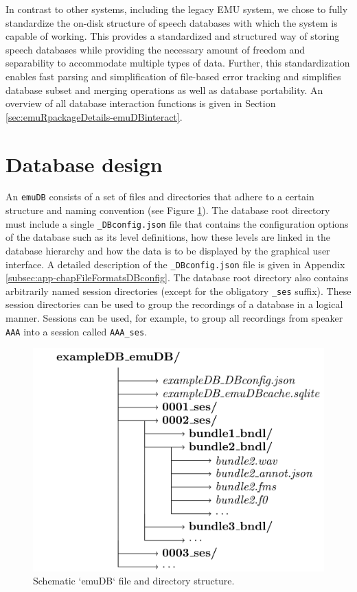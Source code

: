 \documentclass[]{book}
\theoremstyle{definition}
\theoremstyle{definition}
\theoremstyle{definition}
\theoremstyle{remark}
\begin{document}
In contrast to other systems, including the legacy EMU system, we chose
to fully standardize the on-disk structure of speech databases with
which the system is capable of working. This provides a standardized and
structured way of storing speech databases while providing the necessary
amount of freedom and separability to accommodate multiple types of
data. Further, this standardization enables fast parsing and
simplification of file-based error tracking and simplifies database
subset and merging operations as well as database portability. An
overview of all database interaction functions is given in Section
\ref{sec:emuRpackageDetails-emuDBinteract}.

\hypertarget{database-design}{%
\section{Database design}\label{database-design}}

An \texttt{emuDB} consists of a set of files and directories that adhere
to a certain structure and naming convention (see Figure
\ref{fig:schematic-emuDB-structure}). The database root directory must
include a single \texttt{\_DBconfig.json} file that contains the
configuration options of the database such as its level definitions, how
these levels are linked in the database hierarchy and how the data is to
be displayed by the graphical user interface. A detailed description of
the \texttt{\_DBconfig.json} file is given in Appendix
\ref{subsec:app-chapFileFormatsDBconfig}. The database root directory
also contains arbitrarily named session directories (except for the
obligatory \texttt{\_ses} suffix). These session directories can be used
to group the recordings of a database in a logical manner. Sessions can
be used, for example, to group all recordings from speaker \texttt{AAA}
into a session called \texttt{AAA\_ses}.

\begin{figure}

{\centering \includegraphics[width=0.65\linewidth]{pics/db_structure} 

}

\caption{Schematic `emuDB` file and directory structure.}\label{fig:schematic-emuDB-structure}
\end{figure}
\end{document}
